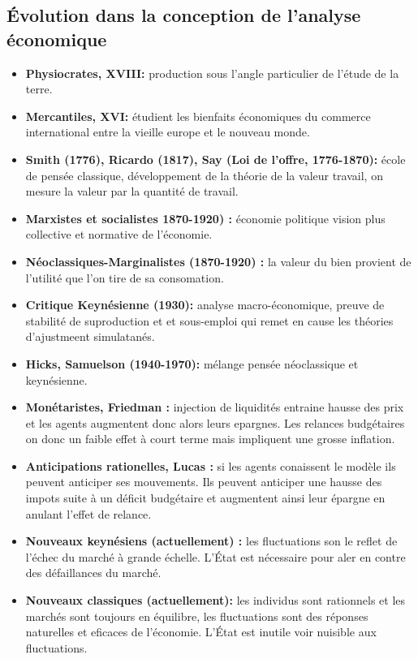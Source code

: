 

\subsection{Évolution dans la conception de l'analyse économique} %
\label{sec:evolution_dans_la_conception_de_l_analyse_economique}

\begin{itemize}[label= ]
	\item \textbf{Physiocrates, XVIII:} production sous l'angle particulier de l'étude de la terre. 
	\item \textbf{Mercantiles, XVI:} étudient les bienfaits économiques du commerce international entre la vieille europe et le nouveau monde.
	\item \textbf{Smith (1776), Ricardo (1817), Say (Loi de l'offre, 1776-1870):} école de pensée classique, développement de la théorie de la valeur travail, on mesure la valeur par la quantité de travail.
	\item \textbf{Marxistes et socialistes 1870-1920) :} économie politique vision plus collective et normative de l'économie.
	\item \textbf{Néoclassiques-Marginalistes (1870-1920) :} la valeur du bien provient de l'utilité que l'on tire de sa consomation.
	\item \textbf{Critique Keynésienne (1930):} analyse macro-économique, preuve de stabilité de suproduction et et sous-emploi qui remet en cause les théories d'ajustmeent simulatanés.
	\item \textbf{Hicks, Samuelson (1940-1970):} mélange pensée néoclassique et keynésienne.
	\item \textbf{Monétaristes, Friedman :} injection de liquidités entraine hausse des prix et les agents augmentent donc alors leurs epargnes. Les relances budgétaires on donc un faible effet à court terme mais impliquent une grosse inflation.
	\item \textbf{Anticipations rationelles, Lucas :} si les agents conaissent le modèle ils peuvent anticiper ses mouvements. Ils peuvent anticiper une hausse des impots suite à un déficit budgétaire et augmentent ainsi leur épargne en anulant l'effet de relance.
	\item \textbf{Nouveaux keynésiens (actuellement) :} les fluctuations son le reflet de l'échec du marché à grande échelle. L'État est nécessaire pour aler en contre des défaillances du marché.
	\item \textbf{Nouveaux classiques (actuellement):} les individus sont rationnels et les marchés sont toujours en équilibre, les fluctuations sont des réponses naturelles et eficaces de l'économie. L'État est inutile voir nuisible aux fluctuations.
\end{itemize}



